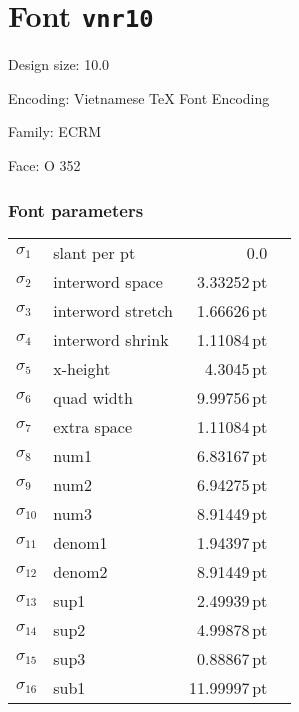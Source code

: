 \documentclass{article}
\newlength{\maxcharwidth}
\begin{document}
\setlength{\maxcharwidth}{71.65162pt}
\addtolength{\maxcharwidth}{2\fboxsep}

\section{Font \texttt{vnr10}}


Design size: 10.0\,

Encoding: Vietnamese TeX Font Encoding

Family: ECRM

Face: O 352

\subsubsection{Font parameters}

\begin{tabular}{@{}llr@{\quad}l}
$\sigma_1$ & slant per pt & 0.0 \\
$\sigma_2$ & interword space & 3.33252\,pt \\
$\sigma_3$ & interword stretch & 1.66626\,pt \\
$\sigma_4$ & interword shrink & 1.11084\,pt \\
$\sigma_5$ & x-height & 4.3045\,pt \\
$\sigma_6$ & quad width & 9.99756\,pt \\
$\sigma_7$ & extra space & 1.11084\,pt \\
$\sigma_8$ & num1 & 6.83167\,pt \\
$\sigma_9$ & num2 & 6.94275\,pt \\
$\sigma_{10}$ & num3 & 8.91449\,pt \\
$\sigma_{11}$ & denom1 & 1.94397\,pt \\
$\sigma_{12}$ & denom2 & 8.91449\,pt \\
$\sigma_{13}$ & sup1 & 2.49939\,pt \\
$\sigma_{14}$ & sup2 & 4.99878\,pt \\
$\sigma_{15}$ & sup3 & 0.88867\,pt \\
$\sigma_{16}$ & sub1 & 11.99997\,pt \\
\end{tabular}
\end{document}

